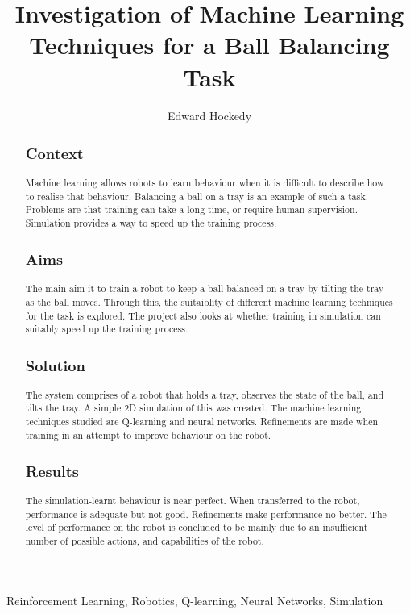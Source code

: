 \documentclass[12pt,a4paper]{article}
\title{Investigation of Machine Learning Techniques for a Ball Balancing Task}
\author{Edward Hockedy}
\date{}
\begin{document}
\maketitle

\begin{abstract}
\subsection{Context}
Machine learning allows robots to learn behaviour when it is difficult to describe how to realise that behaviour. Balancing a ball on a tray is an example of such a task. Problems are that training can take a long time, or require human supervision. Simulation provides a way to speed up the training process. 

\subsection{Aims}
The main aim it to train a robot to keep a ball balanced on a tray by tilting the tray as the ball moves. Through this, the suitaiblity of different machine learning techniques for the task is explored. The project also looks at whether training in simulation can suitably speed up the training process.

\subsection{Solution}
The system comprises of a robot that holds a tray, observes the state of the ball, and tilts the tray. A simple 2D simulation of this was created. The machine learning techniques studied are Q-learning and neural networks. Refinements are made when training in an attempt to improve behaviour on the robot.

\subsection{Results}
The simulation-learnt behaviour is near perfect. When transferred to the robot, performance is adequate but not good. Refinements make performance no better. The level of performance on the robot is concluded to be mainly due to an insufficient number of possible actions, and capabilities of the robot.

\end{abstract}

\begin{keywords}
Reinforcement Learning, Robotics, Q-learning, Neural Networks, Simulation
\end{keywords}
\end{document}
